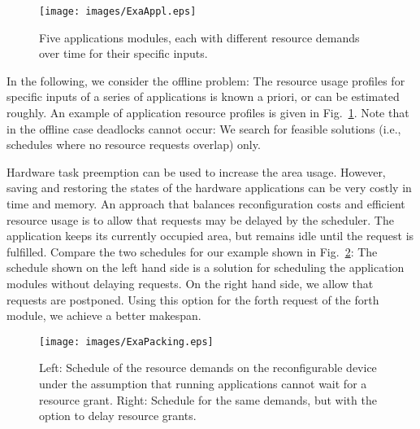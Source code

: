 \documentclass[10pt,journal]{IEEEtran}
\begin{document}
\begin{figure}[b]
        \centering \texttt{[image: images/ExaAppl.eps]}
        \caption{Five applications modules, each with different resource 
          demands over time for their specific inputs.} \label{fig:profile}
\end{figure}

In the following, we consider the offline problem: The resource
usage profiles for specific inputs of a series of applications is
known a priori, or can be estimated roughly. 
An example of application resource profiles is given
in Fig.~\ref{fig:profile}. 
Note that in the offline case deadlocks cannot occur:
We search for feasible solutions (i.e., 
schedules where no resource requests overlap) only.

Hardware task preemption can be used to increase the area
usage. However, saving and restoring the states of the hardware
applications can be very costly in time and memory. 
An approach that balances 
reconfiguration costs and efficient resource usage is 
to allow that requests may be delayed by the scheduler. 
The application keeps its currently occupied area, but remains
idle until the request is fulfilled.
Compare the two schedules for our example 
shown in Fig.~\ref{fig:example_with_wait}: The schedule shown on the left
hand side is a solution for scheduling the application modules without
delaying requests. On the right hand side, we allow that requests are
postponed. Using this option for the forth request of the forth
module, we achieve a better makespan. 

\begin{figure}[t]
        \centering 
        \texttt{[image: images/ExaPacking.eps]}
        \caption{Left: Schedule of the resource demands on the
          reconfigurable device under the assumption that running
          applications cannot wait for a resource grant.
          Right: Schedule for the same demands, but with the
          option to delay resource grants.
        } \label{fig:example_with_wait}
\end{figure}
\end{document}
